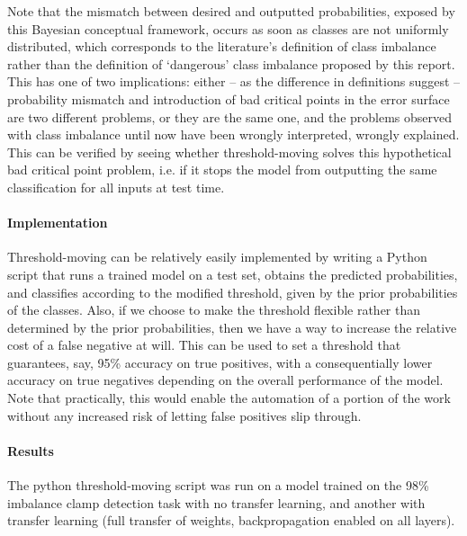 \documentclass[a4paper,11pt]{article}
\begin{document}
Note that the mismatch between desired and outputted probabilities, exposed by this Bayesian conceptual framework, occurs as soon as classes are not uniformly distributed, which corresponds to the literature's definition of class imbalance rather than the definition of `dangerous' class imbalance proposed by this report. This has one of two implications: either -- as the difference in definitions suggest -- probability mismatch and introduction of bad critical points in the error surface are two different problems, or they are the same one, and the problems observed with class imbalance until now have been wrongly interpreted, wrongly explained. This can be verified by seeing whether threshold-moving solves this hypothetical bad critical point problem, i.e. if it stops the model from outputting the same classification for all inputs at test time. \\

\paragraph{Implementation}
Threshold-moving can be relatively easily implemented by writing a Python script that runs a trained model on a test set, obtains the predicted probabilities, and classifies according to the modified threshold, given by the prior probabilities of the classes. Also, if we choose to make the threshold flexible rather than determined by the prior probabilities, then we have a way to increase the relative cost of a false negative at will. This can be used to set a threshold that guarantees, say, 95\% accuracy on true positives, with a consequentially lower accuracy on true negatives depending on the overall performance of the model. Note that practically, this would enable the automation of a portion of the work without any increased risk of letting false positives slip through. \\

\paragraph{Results}
The python threshold-moving script was run on a model trained on the 98\% imbalance clamp detection task with no transfer learning, and another with transfer learning (full transfer of weights, backpropagation enabled on all layers). 
\end{document}
